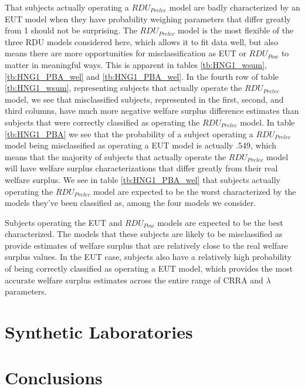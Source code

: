 \documentclass[../main.tex]{subfiles}
\begin{document}
That subjects actually operating a $\mathit{RDU_{Prelec}}$ model are badly characterized by an EUT model when they have probability weighing parameters that differ greatly from 1 should not be surprising.
The $\mathit{RDU_{Prelec}}$ model is the most flexible of the three RDU models considered here, which allows it to fit data well, but also means there are more opportunities for misclassification as EUT or $\mathit{RDU_{Pow}}$ to matter in meaningful ways.
This is apparent in tables \ref{tb:HNG1_wsum}, \ref{tb:HNG1_PBA_wel} and \ref{tb:HNG1_PBA_wel}.
In the fourth row of table \ref{tb:HNG1_wsum}, representing subjects that actually operate the $\mathit{RDU_{Prelec}}$ model, we see that misclassified subjects, represented in the first, second, and third columns, have much more negative welfare surplus difference estimates than subjects that were correctly classified as operating the $\mathit{RDU_{Prelec}}$ model.
In table \ref{tb:HNG1_PBA} we see that the probability of a subject operating a $\mathit{RDU_{Prelec}}$ model being misclassified as operating a EUT model is actually .549, which means that the majority of subjects that actually operate the $\mathit{RDU_{Prelec}}$ model will have welfare surplus characterizations that differ greatly from their real welfare surplus.
We see in table \ref{tb:HNG1_PBA_wel} that subjects actually operating the $\mathit{RDU_{Prelec}}$ model are expected to be the worst characterized by the models they've been classified as, among the four models we consider.

Subjects operating the EUT and $\mathit{RDU_{Pow}}$ models are expected to be the best characterized.
The models that these subjects are likely to be misclassified as provide estimates of welfare surplus that are relatively close to the real welfare surplus values.
In the EUT case, subjects also have a relatively high probability of being correctly classified as operating a EUT model, which provides the most accurate welfare surplus estimates across the entire range of CRRA and $\lambda$ parameters.








\section{Synthetic Laboratories}


\section{Conclusions}

\onlyinsubfile{
\newpage
\printbibliography[segment=4, heading=subbibliography]
}
\end{document}
